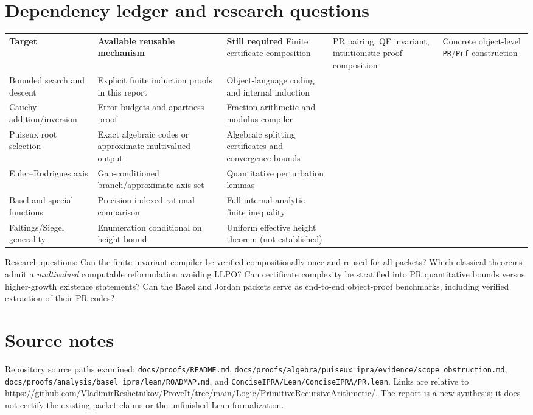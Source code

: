 \documentclass[11pt]{article}
\begin{document}
\section{Dependency ledger and research questions}
\begin{longtable}{p{.25\linewidth}p{.39\linewidth}p{.26\linewidth}}\textbf{Target}&\textbf{Available reusable mechanism}&\textbf{Still required}\endhead
Finite certificate composition&PR pairing, QF invariant, intuitionistic proof composition&Concrete object-level \texttt{PR}/\texttt{Prf} construction\\
Bounded search and descent&Explicit finite induction proofs in this report&Object-language coding and internal induction\\
Cauchy addition/inversion&Error budgets and apartness proof&Fraction arithmetic and modulus compiler\\
Puiseux root selection&Exact algebraic codes or approximate multivalued output&Algebraic splitting certificates and convergence bounds\\
Euler--Rodrigues axis&Gap-conditioned branch/approximate axis set&Quantitative perturbation lemmas\\
Basel and special functions&Precision-indexed rational comparison&Full internal analytic finite inequality\\
Faltings/Siegel generality&Enumeration conditional on height bound&Uniform effective height theorem (not established)\\
\end{longtable}
Research questions: Can the finite invariant compiler be verified compositionally once and reused for all packets? Which classical theorems admit a \emph{multivalued} computable reformulation avoiding LLPO? Can certificate complexity be stratified into PR quantitative bounds versus higher-growth existence statements? Can the Basel and Jordan packets serve as end-to-end object-proof benchmarks, including verified extraction of their PR codes?

\section*{Source notes}
Repository source paths examined: \texttt{docs/proofs/README.md}, \texttt{docs/proofs/algebra/puiseux\_ipra/evidence/scope\_obstruction.md}, \texttt{docs/proofs/analysis/basel\_ipra/lean/ROADMAP.md}, and \texttt{ConciseIPRA/Lean/ConciseIPRA/PR.lean}. Links are relative to \url{https://github.com/VladimirReshetnikov/ProveIt/tree/main/Logic/PrimitiveRecursiveArithmetic/}. The report is a new synthesis; it does not certify the existing packet claims or the unfinished Lean formalization.
\end{document}
